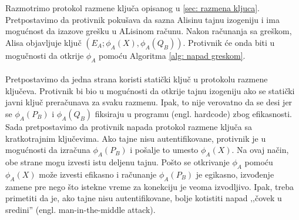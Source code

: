 \documentclass[a4paper]{article}
\begin{document}
Razmotrimo protokol razmene ključa opisanog u \ref{sec: razmena kljuca}. Pretpostavimo da protivnik pokušava da sazna Alisinu tajnu izogeniju i ima mogućnost da izazove grešku u ALisinom računu. Nakon računanja sa greškom, Alisa objavljuje ključ $(E_A; \phi_A(X), \phi_A(Q_B))$. Protivnik će onda biti u mogučnosti da otkrije $\phi_A$ pomoću Algoritma \ref{alg: napad greskom}.
\\
\\
Pretpostavimo da jedna strana koristi statički ključ u protokolu razmene ključeva. Protivnik bi bio u mogućnosti da otkrije tajnu izogeniju ako se statički javni ključ preračunava za svaku razmenu. Ipak, to nije verovatno da se desi jer se $\phi_A(P_B)$ i $\phi_A(Q_B)$ fiksiraju u programu (engl. hardcode) zbog efikasnosti. 
Sada pretpostavimo da protivnik napada protokol razmene ključa sa kratkotrajnim ključevima. Ako tajne nisu autentifikovane, protivnik je u mogućnosti da izračuna $\phi_A(P_B)$ i pošalje to umesto $\phi_A(X)$. Na ovaj način, obe strane mogu izvesti istu deljenu tajnu. Pošto se otkrivanje $\phi_A$ pomoću  $\phi_A(X)$ može izvesti efikasno i računanje  $\phi_A(P_B)$ je egikasno, izvođenje zamene pre nego što istekne vreme za konekciju je veoma izvodljivo. Ipak, treba primetiti da je, ako tajne nisu autentifikovane, bolje kotistiti napad ‚‚čovek u sredini'' (engl. man-in-the-middle attack).
\end{document}
